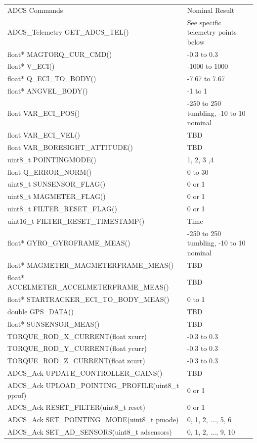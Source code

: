 \documentclass{article}
\begin{document}
\begin{tabular}{|l|l|}
	\hline
	ADCS Commands      &  Nominal Result                \\ \hhline{|=|=|}
	ADCS_Telemetry GET_ADCS_TEL() & See specific telemetry points below \\ \hline
	float* MAGTORQ_CUR_CMD() & -0.3 to 0.3 \\ \hline
	float* V_ECI() & -1000 to 1000 \\ \hline
	float* Q_ECI_TO_BODY() & -7.67 to 7.67 \\ \hline
	float* ANGVEL_BODY() & -1 to 1 \\ \hline
	float VAR_ECI_POS() & -250 to 250 tumbling, -10 to 10 nominal \\ \hline
	float VAR_ECI_VEL() & TBD \\ \hline
	float VAR_BORESIGHT_ATTITUDE() & TBD \\ \hline
	uint8_t POINTINGMODE() & 1, 2, 3 ,4 \\ \hline
	float Q_ERROR_NORM() & 0 to 30 \\ \hline
	uint8_t SUNSENSOR_FLAG() & 0 or 1 \\ \hline
	uint8_t MAGMETER_FLAG() & 0 or 1  \\ \hline
	uint8_t FILTER_RESET_FLAG() & 0 or 1 \\ \hline
	uint16_t FILTER_RESET_TIMESTAMP() & Time \\ \hline
	float* GYRO_GYROFRAME_MEAS() & -250 to 250 tumbling, -10 to 10 nominal \\ \hline
	float* MAGMETER_MAGMETERFRAME_MEAS() & TBD \\ \hline
	float* ACCELMETER_ACCELMETERFRAME_MEAS() & TBD \\ \hline
	float* STARTRACKER_ECI_TO_BODY_MEAS() & 0 to 1 \\ \hline
	double GPS_DATA() & TBD \\ \hline
	float* SUNSENSOR_MEAS() & TBD \\ \hline
	TORQUE_ROD_X_CURRENT(float xcurr) & -0.3 to 0.3 \\ \hline
	TORQUE_ROD_Y_CURRENT(float ycurr) & -0.3 to 0.3 \\ \hline
	TORQUE_ROD_Z_CURRENT(float zcurr)  & -0.3 to 0.3 \\ \hline
	ADCS_Ack UPDATE_CONTROLLER_GAINS() & TBD \\ \hline
	ADCS_Ack UPLOAD_POINTING_PROFILE(uint8_t pprof) & 0 or 1 \\ \hline
	ADCS_Ack RESET_FILTER(uint8_t reset) & 0 or 1 \\ \hline
	ADCS_Ack SET_POINTING_MODE(uint8_t pmode) & 0, 1, 2, $\dots$, 5, 6 \\ \hline
	ADCS_Ack SET_AD_SENSORS(uint8_t adsensors) & 0, 1, 2, $\dots$, 9, 10 \\ \hline
\end{tabular}
\end{document}
